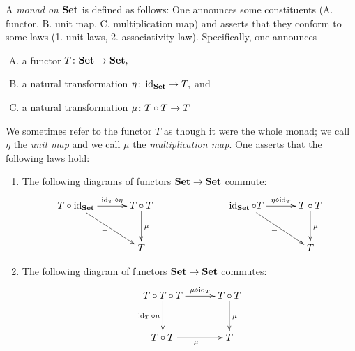 \documentclass[../main/CT4S-EN-RU]{subfiles}
\begin{document}
\begin{blockRUS}
\end{blockRUS}

\begin{definitionENG}[Monad]\label{def:monad}
A {\em monad on ${\mathbf{Set}}$} is defined as follows: One announces some constituents (A. functor, B. unit map, C. multiplication map) and asserts that they conform to some laws (1. unit laws, 2. associativity law). Specifically, one announces
\begin{enumerate}[A.]
\item a functor $T\colon{\mathbf{Set}}\rightarrow{\mathbf{Set}},$
\item a natural transformation $\eta\colon\operatorname{id}_{{\mathbf{Set}}}\rightarrow T,$ and 
\item a natural transformation $\mu\colon T\circ T\rightarrow T$
\end{enumerate}
We sometimes refer to the functor $T$ as though it were the whole monad; we call $\eta$ the {\em unit map} and we call $\mu$ the {\em multiplication map}. One asserts that the following laws hold:
\begin{enumerate}[1.]
\item The following diagrams of functors ${\mathbf{Set}}\rightarrow{\mathbf{Set}}$ commute:
\begin{align*}
\xymatrix@=30pt{T\circ\id_\Set\ar[r]^-{\id_T\diamond\eta}\ar[dr]_{=}&T\circ T\ar[d]^\mu\\&T}\hspace{1in}
\xymatrix@=30pt{\id_\Set\circ T\ar[r]^-{\eta\diamond\id_T}\ar[dr]_=&T\circ T\ar[d]^\mu\\&T}
\end{align*}
\item The following diagram of functors ${\mathbf{Set}}\rightarrow{\mathbf{Set}}$ commutes:
\begin{align*}
\xymatrix@=30pt{T\circ T\circ T\ar[r]^-{\mu\diamond\id_T}\ar[d]_-{\id_T\diamond\mu}&T\circ T\ar[d]^\mu\\T\circ T\ar[r]_\mu&T}\end{align*}
\end{enumerate}
\end{definitionENG}

\begin{definitionRUS}[Monad]\label{def:monad}
\end{definitionRUS}
\end{document}
